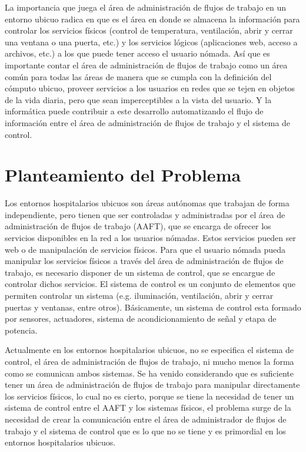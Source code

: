 La importancia que juega el área de administración de flujos de
trabajo en un entorno ubicuo radica en que es el área en donde se
almacena la información para controlar los servicios físicos
(control de temperatura, ventilación, abrir y cerrar una ventana o
una puerta, etc.) y los servicios lógicos (aplicaciones web,
acceso a archivos, etc.) a los que puede tener acceso el usuario
nómada. Así que es importante contar el área de administración de
flujos de trabajo como un área común para todas las áreas de
manera que se cumpla con la definición del cómputo ubicuo, proveer
servicios a los usuarios en redes que se tejen en objetos de la
vida diaria, pero que sean imperceptibles a la vista del usuario.
Y la informática puede contribuir a este desarrollo automatizando
el flujo de información entre el área de administración de flujos
de trabajo y el sistema de control.\\

\vspace{0.2cm}

\newpage
\section{Planteamiento del Problema}
Los entornos hospitalarios ubicuos son áreas autónomas que
trabajan de forma independiente, pero tienen que ser controladas y
administradas por el área de administración de flujos de trabajo
(AAFT), que se encarga de ofrecer los servicios disponibles en la
red a los usuarios nómadas. Estos servicios pueden ser web o de
manipulación de servicios físicos. Para que el usuario nómada
pueda manipular los servicios físicos a través del área de
administración de flujos de trabajo, es necesario disponer de un
sistema de control, que se encargue de controlar dichos servicios.
El sistema de control es un conjunto de elementos que permiten
controlar un sistema (e.g. iluminación, ventilación, abrir y
cerrar puertas y ventanas, entre otros). Básicamente, un sistema
de control esta formado por sensores, actuadores, sistema de
acondicionamiento de señal y etapa de potencia.\\

\vspace{0.2cm}

Actualmente en los entornos hospitalarios ubicuos, no se
especifica el sistema de control, el área de administración de
flujos de trabajo, ni mucho menos la forma como se comunican ambos
sistemas. Se ha venido considerando que es suficiente tener un
área de administración de flujos de trabajo para manipular
directamente los servicios físicos, lo cual no es cierto, porque
se tiene la necesidad de tener un sistema de control entre el AAFT
y los sistemas físicos, el problema surge de la necesidad de crear
la comunicación entre el área de administrador de flujos de
trabajo y el sistema de control que es lo que no se tiene y es
primordial en los entornos hospitalarios ubicuos.\\

